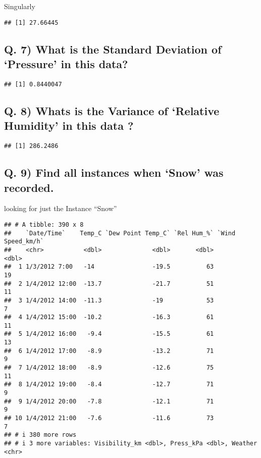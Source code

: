 \documentclass[
]{article}
\begin{document}
Singularly

\begin{verbatim}
## [1] 27.66445
\end{verbatim}

\hypertarget{q.-7-what-is-the-standard-deviation-of-pressure-in-this-data}{%
\subsection{Q. 7) What is the Standard Deviation of `Pressure' in this
data?}\label{q.-7-what-is-the-standard-deviation-of-pressure-in-this-data}}

\begin{verbatim}
## [1] 0.8440047
\end{verbatim}

\hypertarget{q.-8-whats-is-the-variance-of-relative-humidity-in-this-data}{%
\subsection{Q. 8) Whats is the Variance of `Relative Humidity' in this
data
?}\label{q.-8-whats-is-the-variance-of-relative-humidity-in-this-data}}

\begin{verbatim}
## [1] 286.2486
\end{verbatim}

\hypertarget{q.-9-find-all-instances-when-snow-was-recorded.}{%
\subsection{Q. 9) Find all instances when `Snow' was
recorded.}\label{q.-9-find-all-instances-when-snow-was-recorded.}}

looking for just the Instance ``Snow''

\begin{verbatim}
## # A tibble: 390 x 8
##    `Date/Time`    Temp_C `Dew Point Temp_C` `Rel Hum_%` `Wind Speed_km/h`
##    <chr>           <dbl>              <dbl>       <dbl>             <dbl>
##  1 1/3/2012 7:00   -14                -19.5          63                19
##  2 1/4/2012 12:00  -13.7              -21.7          51                11
##  3 1/4/2012 14:00  -11.3              -19            53                 7
##  4 1/4/2012 15:00  -10.2              -16.3          61                11
##  5 1/4/2012 16:00   -9.4              -15.5          61                13
##  6 1/4/2012 17:00   -8.9              -13.2          71                 9
##  7 1/4/2012 18:00   -8.9              -12.6          75                11
##  8 1/4/2012 19:00   -8.4              -12.7          71                 9
##  9 1/4/2012 20:00   -7.8              -12.1          71                 9
## 10 1/4/2012 21:00   -7.6              -11.6          73                 7
## # i 380 more rows
## # i 3 more variables: Visibility_km <dbl>, Press_kPa <dbl>, Weather <chr>
\end{verbatim}
\end{document}
